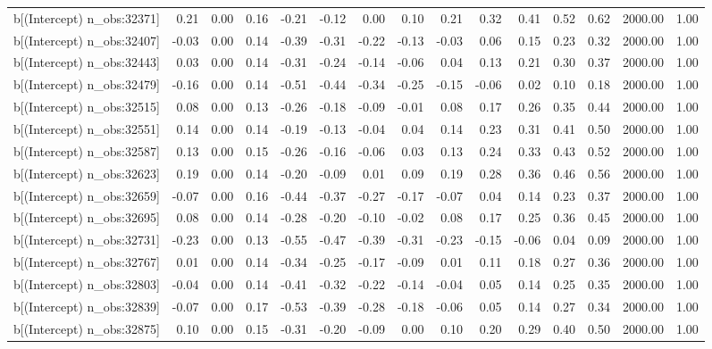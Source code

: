\begin{table}[ht]
\begin{tabular}{rrrrrrrrrrrrrrr}
  b[(Intercept) n\_obs:32371] & 0.21 & 0.00 & 0.16 & -0.21 & -0.12 & 0.00 & 0.10 & 0.21 & 0.32 & 0.41 & 0.52 & 0.62 & 2000.00 & 1.00 \\ 
  b[(Intercept) n\_obs:32407] & -0.03 & 0.00 & 0.14 & -0.39 & -0.31 & -0.22 & -0.13 & -0.03 & 0.06 & 0.15 & 0.23 & 0.32 & 2000.00 & 1.00 \\ 
  b[(Intercept) n\_obs:32443] & 0.03 & 0.00 & 0.14 & -0.31 & -0.24 & -0.14 & -0.06 & 0.04 & 0.13 & 0.21 & 0.30 & 0.37 & 2000.00 & 1.00 \\ 
  b[(Intercept) n\_obs:32479] & -0.16 & 0.00 & 0.14 & -0.51 & -0.44 & -0.34 & -0.25 & -0.15 & -0.06 & 0.02 & 0.10 & 0.18 & 2000.00 & 1.00 \\ 
  b[(Intercept) n\_obs:32515] & 0.08 & 0.00 & 0.13 & -0.26 & -0.18 & -0.09 & -0.01 & 0.08 & 0.17 & 0.26 & 0.35 & 0.44 & 2000.00 & 1.00 \\ 
  b[(Intercept) n\_obs:32551] & 0.14 & 0.00 & 0.14 & -0.19 & -0.13 & -0.04 & 0.04 & 0.14 & 0.23 & 0.31 & 0.41 & 0.50 & 2000.00 & 1.00 \\ 
  b[(Intercept) n\_obs:32587] & 0.13 & 0.00 & 0.15 & -0.26 & -0.16 & -0.06 & 0.03 & 0.13 & 0.24 & 0.33 & 0.43 & 0.52 & 2000.00 & 1.00 \\ 
  b[(Intercept) n\_obs:32623] & 0.19 & 0.00 & 0.14 & -0.20 & -0.09 & 0.01 & 0.09 & 0.19 & 0.28 & 0.36 & 0.46 & 0.56 & 2000.00 & 1.00 \\ 
  b[(Intercept) n\_obs:32659] & -0.07 & 0.00 & 0.16 & -0.44 & -0.37 & -0.27 & -0.17 & -0.07 & 0.04 & 0.14 & 0.23 & 0.37 & 2000.00 & 1.00 \\ 
  b[(Intercept) n\_obs:32695] & 0.08 & 0.00 & 0.14 & -0.28 & -0.20 & -0.10 & -0.02 & 0.08 & 0.17 & 0.25 & 0.36 & 0.45 & 2000.00 & 1.00 \\ 
  b[(Intercept) n\_obs:32731] & -0.23 & 0.00 & 0.13 & -0.55 & -0.47 & -0.39 & -0.31 & -0.23 & -0.15 & -0.06 & 0.04 & 0.09 & 2000.00 & 1.00 \\ 
  b[(Intercept) n\_obs:32767] & 0.01 & 0.00 & 0.14 & -0.34 & -0.25 & -0.17 & -0.09 & 0.01 & 0.11 & 0.18 & 0.27 & 0.36 & 2000.00 & 1.00 \\ 
  b[(Intercept) n\_obs:32803] & -0.04 & 0.00 & 0.14 & -0.41 & -0.32 & -0.22 & -0.14 & -0.04 & 0.05 & 0.14 & 0.25 & 0.35 & 2000.00 & 1.00 \\ 
  b[(Intercept) n\_obs:32839] & -0.07 & 0.00 & 0.17 & -0.53 & -0.39 & -0.28 & -0.18 & -0.06 & 0.05 & 0.14 & 0.27 & 0.34 & 2000.00 & 1.00 \\ 
  b[(Intercept) n\_obs:32875] & 0.10 & 0.00 & 0.15 & -0.31 & -0.20 & -0.09 & 0.00 & 0.10 & 0.20 & 0.29 & 0.40 & 0.50 & 2000.00 & 1.00 \\ 

\end{tabular}
\end{table}
